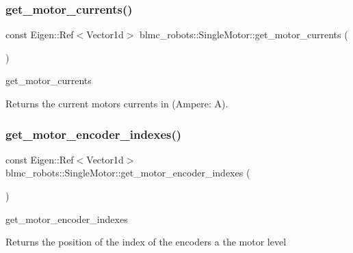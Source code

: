 \subsubsection{\texorpdfstring{get\+\_\+motor\+\_\+currents()}{get\_motor\_currents()}}
{\footnotesize\ttfamily const Eigen\+::\+Ref$<$Vector1d$>$ blmc\+\_\+robots\+::\+Single\+Motor\+::get\+\_\+motor\+\_\+currents (\begin{DoxyParamCaption}{ }\end{DoxyParamCaption})\hspace{0.3cm}{\ttfamily [inline]}}



get\+\_\+motor\+\_\+currents 

\begin{DoxyReturn}{Returns}
the current motors currents in (Ampere\+: A). 
\end{DoxyReturn}
\mbox{\label{classblmc__robots_1_1SingleMotor_a1a7ff027c499ed3fc164a399e5b498e1}} 
\subsubsection{\texorpdfstring{get\+\_\+motor\+\_\+encoder\+\_\+indexes()}{get\_motor\_encoder\_indexes()}}
{\footnotesize\ttfamily const Eigen\+::\+Ref$<$Vector1d$>$ blmc\+\_\+robots\+::\+Single\+Motor\+::get\+\_\+motor\+\_\+encoder\+\_\+indexes (\begin{DoxyParamCaption}{ }\end{DoxyParamCaption})\hspace{0.3cm}{\ttfamily [inline]}}



get\+\_\+motor\+\_\+encoder\+\_\+indexes 

\begin{DoxyReturn}{Returns}
the position of the index of the encoders a the motor level 
\end{DoxyReturn}
\mbox{\label{classblmc__robots_1_1SingleMotor_a7126966be33a93491dcf10d62f711768}} 
